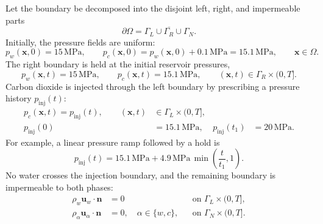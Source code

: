 \documentclass{article}
\begin{document}
Let the boundary be decomposed into the disjoint left, right, and
impermeable parts
\[
    \partial\Omega
    =
    \overline{\Gamma_L\cup\Gamma_R\cup\Gamma_N}.
\]
Initially, the pressure fields are uniform:
\[
    p_w(\boldsymbol{x},0)=15\,\mathrm{MPa},
    \qquad
    p_c(\boldsymbol{x},0)
    =
    p_w(\boldsymbol{x},0)+0.1\,\mathrm{MPa}
    =
    15.1\,\mathrm{MPa},
    \qquad \boldsymbol{x}\in\Omega.
\]
The right boundary is held at the initial reservoir pressures,
\[
    p_w(\boldsymbol{x},t)=15\,\mathrm{MPa},
    \qquad
    p_c(\boldsymbol{x},t)=15.1\,\mathrm{MPa},
    \qquad
    (\boldsymbol{x},t)\in\Gamma_R\times(0,T].
\]
Carbon dioxide is injected through the left boundary by prescribing a
pressure history $p_{\mathrm{inj}}(t)$:
\begin{align*}
    p_c(\boldsymbol{x},t)=p_{\mathrm{inj}}(t),
    \qquad
    (\boldsymbol{x},t)&\in\Gamma_L\times(0,T],\\
    p_{\mathrm{inj}}(0)&=15.1\,\mathrm{MPa},
    &
    p_{\mathrm{inj}}(t_1)&=20\,\mathrm{MPa}.
\end{align*}
For example, a linear pressure ramp followed by a hold is
\[
    p_{\mathrm{inj}}(t)
    =
    15.1\,\mathrm{MPa}
    +
    4.9\,\mathrm{MPa}\,
    \min\left(\frac{t}{t_1},1\right).
\]
No water crosses the injection boundary, and the remaining boundary is
impermeable to both phases:
\begin{align*}
    \rho_w\boldsymbol{u}_w\cdot\boldsymbol{n}&=0
    &&\text{on }\Gamma_L\times(0,T],\\
    \rho_\alpha\boldsymbol{u}_\alpha\cdot\boldsymbol{n}&=0,
    \quad \alpha\in\{w,c\},
    &&\text{on }\Gamma_N\times(0,T].
\end{align*}
\end{document}
